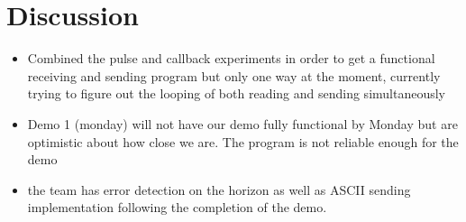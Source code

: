 \documentclass{article}
\begin{document}
\section*{Discussion}
\begin{itemize}
\item Combined the pulse and callback experiments in order to get a functional receiving and sending program but only one way at the moment, currently trying to figure out the looping of both reading and sending simultaneously
\item Demo 1 (monday) will not have our demo fully functional by Monday but are optimistic about how close we are. The program is not reliable enough for the demo
\item the team has error detection on the horizon as well as ASCII sending implementation following the completion of the demo. 
\end{itemize}
\end{document}
